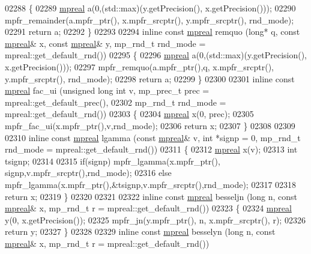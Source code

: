 \begin{DoxyCode}
{{02288 \{
02289     \hyperlink{classmpfr_1_1mpreal}{mpreal} a(0,(std::max)(y.getPrecision(), x.getPrecision()));
02290     mpfr\_remainder(a.mpfr\_ptr(), x.mpfr\_srcptr(), y.mpfr\_srcptr(), rnd\_mode);
02291     \textcolor{keywordflow}{return} a;
02292 \}
02293 
02294 \textcolor{keyword}{inline} \textcolor{keyword}{const} \hyperlink{classmpfr_1_1mpreal}{mpreal} remquo (\textcolor{keywordtype}{long}* q, \textcolor{keyword}{const} \hyperlink{classmpfr_1_1mpreal}{mpreal}& x, \textcolor{keyword}{const} \hyperlink{classmpfr_1_1mpreal}{mpreal}& y, mp\_rnd\_t rnd\_mode 
      = mpreal::get\_default\_rnd())
02295 \{
02296     \hyperlink{classmpfr_1_1mpreal}{mpreal} a(0,(std::max)(y.getPrecision(), x.getPrecision()));
02297     mpfr\_remquo(a.mpfr\_ptr(),q, x.mpfr\_srcptr(), y.mpfr\_srcptr(), rnd\_mode);
02298     \textcolor{keywordflow}{return} a;
02299 \}
02300 
02301 \textcolor{keyword}{inline} \textcolor{keyword}{const} \hyperlink{classmpfr_1_1mpreal}{mpreal} fac\_ui (\textcolor{keywordtype}{unsigned} \textcolor{keywordtype}{long} \textcolor{keywordtype}{int} v, mp\_prec\_t prec     = mpreal::get\_default\_prec(),
02302                                            mp\_rnd\_t  rnd\_mode = mpreal::get\_default\_rnd())
02303 \{
02304     \hyperlink{classmpfr_1_1mpreal}{mpreal} x(0, prec);
02305     mpfr\_fac\_ui(x.mpfr\_ptr(),v,rnd\_mode);
02306     \textcolor{keywordflow}{return} x;
02307 \}
02308 
02309 
02310 \textcolor{keyword}{inline} \textcolor{keyword}{const} \hyperlink{classmpfr_1_1mpreal}{mpreal} lgamma (\textcolor{keyword}{const} \hyperlink{classmpfr_1_1mpreal}{mpreal}& v, \textcolor{keywordtype}{int} *signp = 0, mp\_rnd\_t rnd\_mode = 
      mpreal::get\_default\_rnd())
02311 \{
02312     \hyperlink{classmpfr_1_1mpreal}{mpreal} x(v);
02313     \textcolor{keywordtype}{int} tsignp;
02314 
02315     \textcolor{keywordflow}{if}(signp)   mpfr\_lgamma(x.mpfr\_ptr(),  signp,v.mpfr\_srcptr(),rnd\_mode);
02316     \textcolor{keywordflow}{else}        mpfr\_lgamma(x.mpfr\_ptr(),&tsignp,v.mpfr\_srcptr(),rnd\_mode);
02317 
02318     \textcolor{keywordflow}{return} x;
02319 \}
02320 
02321 
02322 \textcolor{keyword}{inline} \textcolor{keyword}{const} \hyperlink{classmpfr_1_1mpreal}{mpreal} besseljn (\textcolor{keywordtype}{long} n, \textcolor{keyword}{const} \hyperlink{classmpfr_1_1mpreal}{mpreal}& x, mp\_rnd\_t r = mpreal::get\_default\_rnd())
02323 \{
02324     \hyperlink{classmpfr_1_1mpreal}{mpreal}  y(0, x.getPrecision());
02325     mpfr\_jn(y.mpfr\_ptr(), n, x.mpfr\_srcptr(), r);
02326     \textcolor{keywordflow}{return} y;
02327 \}
02328 
02329 \textcolor{keyword}{inline} \textcolor{keyword}{const} \hyperlink{classmpfr_1_1mpreal}{mpreal} besselyn (\textcolor{keywordtype}{long} n, \textcolor{keyword}{const} \hyperlink{classmpfr_1_1mpreal}{mpreal}& x, mp\_rnd\_t r = mpreal::get\_default\_rnd())
}}
\end{DoxyCode}
